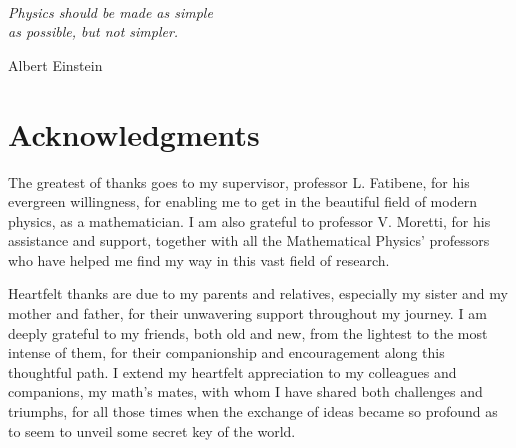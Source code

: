 

\LogoWidth{4.5cm} %

\begin{titlepage}
    \pagestyle{empty}
    \makefrontpage
    \restoregeometry
\end{titlepage}

\frontmatter
~ \newpage
\null{}
\begin{flushright}
    \textit{Physics should be made as simple\\ as possible, but not simpler.}
    
    Albert Einstein
\end{flushright}
\null

\chapter*{Acknowledgments}
The greatest of thanks goes to my supervisor, professor L. Fatibene, for his evergreen willingness, for enabling me to get in the beautiful field of modern physics, as a mathematician. I am also grateful to professor V. Moretti, for his assistance and support, together with all the Mathematical Physics' professors who have helped me find my way in this vast field of research. 

Heartfelt thanks are due to my parents and relatives, especially my sister and my mother and father, for their unwavering support throughout my journey. I am deeply grateful to my friends, both old and new, from the lightest to the most intense of them, for their companionship and encouragement along this thoughtful path. %
I extend my heartfelt appreciation to my colleagues and companions, my math's mates, with whom I have shared both challenges and triumphs, for all those times when the exchange of ideas became so profound as to seem to unveil some secret key of the world. 

